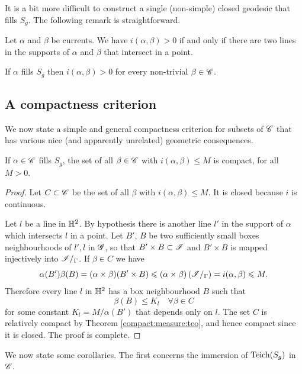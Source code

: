 It is a bit more difficult to construct a single (non-simple) closed geodesic that fills $S_g$. The following remark is straightforward.

\begin{oss} \label{correnti:oss}
Let $\alpha$ and $\beta$ be currents. We have $i(\alpha,\beta)>0$ if and only if there are two lines in the supports of $\alpha$ and $\beta$ that intersect in a point.
\end{oss}

\begin{cor} \label{riempie:cor}
If $\alpha$ fills $S_g$ then $i(\alpha,\beta)>0$ for every non-trivial $\beta\in\mathscr{C}$.
\end{cor}

\subsection{A compactness criterion}
We now state a simple and general compactness criterion for subsets of $\mathscr{C}$ that has various nice (and apparently unrelated) geometric consequences.

\begin{prop} \label{compattezza:C:prop}
If $\alpha\in\mathscr{C}$ fills $S_g$, the set of all $\beta\in\mathscr{C}$ with $i(\alpha,\beta)\leqslant M$ is compact, for all $M>0$.
\end{prop}
\begin{proof}
Let $C\subset\mathscr{C}$ be the set of all $\beta$ with $i(\alpha,\beta)\leqslant M$. It is closed because $i$ is continuous.

Let $l$ be a line in $\mathbb{H}^2$. By hypothesis there is another line $l'$ in the support of $\alpha$ which intersects $l$ in a point. Let $B'$, $B$ be two sufficiently small boxes neighbourhoods of $l',l$ in $\mathscr{G}$, so that $B' \times B \subset \mathscr{I}$ and
$B' \times B$ is mapped injectively into $\mathscr{I}/_\Gamma$.
If $\beta\in C$ we have
$$\alpha(B')\beta(B) = (\alpha\times\beta)(B' \times B) \leqslant (\alpha\times\beta)\left(\mathscr{I}/_\Gamma\right) = i(\alpha,\beta) \leqslant M.$$
Therefore every line $l$ in $\mathbb{H}^2$ has a box neighbourhood $B$ such that
$$\beta(B) \leqslant K_l \quad \forall \beta \in C$$
for some constant $K_l = M/\alpha(B')$ that depends only on $l$. The set $C$ is relatively compact by Theorem \ref{compact:measure:teo}, and hence compact since it is closed. The proof is complete.
\end{proof}

We now state some corollaries. The first concerns the immersion of ${\rm Teich}(S_g)$ in $\mathscr{C}$. 

